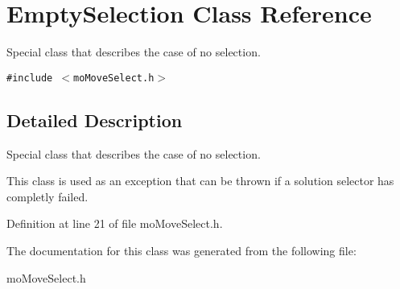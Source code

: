 \section{EmptySelection Class Reference}
\label{class_empty_selection}
Special class that describes the case of no selection.  


{\tt \#include $<$moMoveSelect.h$>$}



\subsection{Detailed Description}
Special class that describes the case of no selection. 

This class is used as an exception that can be thrown if a solution selector has completly failed. 



Definition at line 21 of file moMoveSelect.h.

The documentation for this class was generated from the following file:\begin{CompactItemize}
\item 
moMoveSelect.h\end{CompactItemize}
